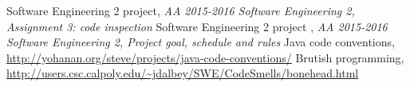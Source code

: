 \begingroup
    \renewcommand{\section}[2]{}%
    \begin{thebibliography}{1}
            Software Engineering 2 project,
            \emph{AA 2015-2016 Software Engineering 2, Assignment 3: code inspection}
            Software Engineering 2 project ,
            \emph{AA 2015-2016 Software Engineering 2, Project goal, schedule and rules}
            Java code conventions, \url{http://yohanan.org/steve/projects/java-code-conventions/}
            Brutish programming, \url{http://users.csc.calpoly.edu/~jdalbey/SWE/CodeSmells/bonehead.html}
    \end{thebibliography}
\endgroup